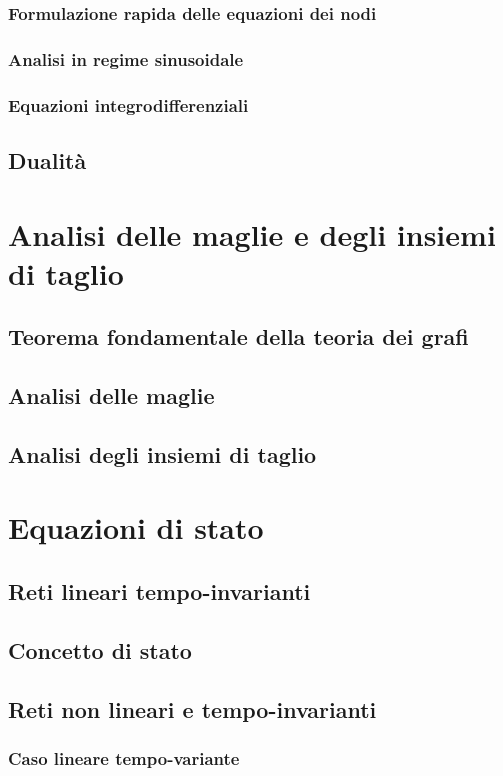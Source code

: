 \documentclass[a4paper,12pt]{article}
\theoremstyle{mystyle}
\begin{document}
\subsubsection{Formulazione rapida delle equazioni dei nodi}
\subsubsection{Analisi in regime sinusoidale}
\subsubsection{Equazioni integrodifferenziali}

\subsection{Dualità}

\section{Analisi delle maglie e degli insiemi di taglio}
\subsection{Teorema fondamentale della teoria dei grafi}
\subsection{Analisi delle maglie}
\subsection{Analisi degli insiemi di taglio}

\section{Equazioni di stato}
\subsection{Reti lineari tempo-invarianti}
\subsection{Concetto di stato}
\subsection{Reti non lineari e tempo-invarianti}
\subsubsection{Caso lineare tempo-variante}
\end{document}
